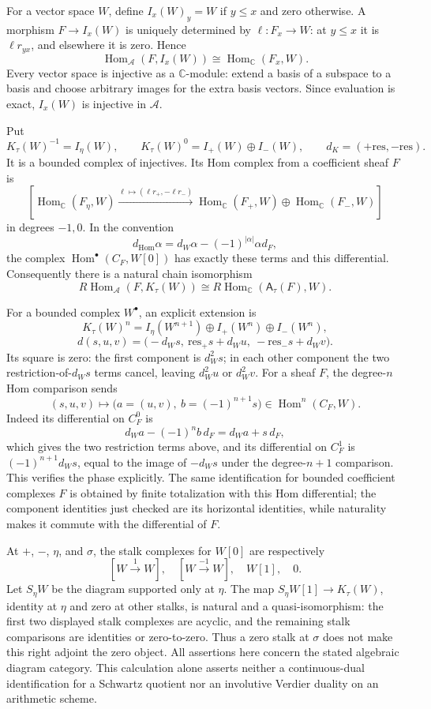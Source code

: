 For a vector space \(W\), define \(I_x(W)_y=W\) if \(y\le x\)
and zero otherwise. A morphism \(F\to I_x(W)\) is uniquely
determined by \(\ell:F_x\to W\): at \(y\le x\) it is
\(\ell r_{yx}\), and elsewhere it is zero. Hence
\[
\operatorname{Hom}_{\mathcal A}(F,I_x(W))
\cong\operatorname{Hom}_{\mathbb C}(F_x,W).
\]
Every vector space is injective as a \(\mathbb C\)-module: extend
a basis of a subspace to a basis and choose arbitrary images for
the extra basis vectors. Since evaluation is exact, \(I_x(W)\)
is injective in \(\mathcal A\).

Put
\[
K_\tau(W)^{-1}=I_\eta(W),\qquad
K_\tau(W)^0=I_+(W)\oplus I_-(W),\qquad
d_K=(+\mathrm{res},-\mathrm{res}).
\]
It is a bounded complex of injectives. Its Hom complex from a
coefficient sheaf \(F\) is
\[
\left[
\operatorname{Hom}_{\mathbb C}(F_\eta,W)
\xrightarrow{\ell\mapsto(\ell r_+,-\ell r_-)}
\operatorname{Hom}_{\mathbb C}(F_+,W)\oplus
\operatorname{Hom}_{\mathbb C}(F_-,W)
\right]
\]
in degrees \(-1,0\). In the convention
\[
d_{\operatorname{Hom}}\alpha
=d_W\alpha-(-1)^{|\alpha|}\alpha d_F,
\]
the complex \(\operatorname{Hom}^\bullet(C_F,W[0])\) has
exactly these terms and this differential. Consequently there
is a natural chain isomorphism
\[
R\operatorname{Hom}_{\mathcal A}(F,K_\tau(W))
\cong R\operatorname{Hom}_{\mathbb C}(\mathsf A_\tau(F),W).
\]

For a bounded complex \(W^\bullet\), an explicit extension is
\[
K_\tau(W)^n=
I_\eta(W^{n+1})\oplus I_+(W^n)\oplus I_-(W^n),
\]
\[
d(s,u,v)=
\bigl(-d_Ws,\ \mathrm{res}_+s+d_Wu,\
-\mathrm{res}_-s+d_Wv\bigr).
\]
Its square is zero: the first component is \(d_W^2s\);
in each other component the two restriction-of-\(d_Ws\) terms
cancel, leaving \(d_W^2u\) or \(d_W^2v\).
For a sheaf \(F\), the degree-\(n\) Hom comparison sends
\[
(s,u,v)\longmapsto
\bigl(a=(u,v),\ b=(-1)^{n+1}s\bigr)
\in\operatorname{Hom}^n(C_F,W).
\]
Indeed its differential on \(C_F^0\) is
\[
d_Wa-(-1)^n b\,d_F=d_Wa+s\,d_F,
\]
which gives the two restriction terms above, and its differential
on \(C_F^1\) is
\((-1)^{n+1}d_Ws\), equal to the image of \(-d_Ws\) under
the degree-\(n+1\) comparison. This verifies the phase explicitly.
The same identification for bounded coefficient complexes \(F\)
is obtained by finite totalization with this Hom differential;
the component identities just checked are its horizontal
identities, while naturality makes it commute with the
differential of \(F\).

At \(+\), \(-\), \(\eta\), and \(\sigma\), the stalk complexes for
\(W[0]\) are respectively
\[
[W\xrightarrow{1}W],\quad
[W\xrightarrow{-1}W],\quad W[1],\quad0.
\]
Let \(S_\eta W\) be the diagram supported only at \(\eta\).
The map \(S_\eta W[1]\to K_\tau(W)\), identity at \(\eta\)
and zero at other stalks, is natural and a quasi-isomorphism:
the first two displayed stalk complexes are acyclic, and the
remaining stalk comparisons are identities or zero-to-zero.
Thus a zero stalk at \(\sigma\) does not make this right adjoint
the zero object. All assertions here concern the stated
algebraic diagram category. This calculation alone asserts
neither a continuous-dual identification for a Schwartz
quotient nor an involutive Verdier duality on an arithmetic
scheme.

